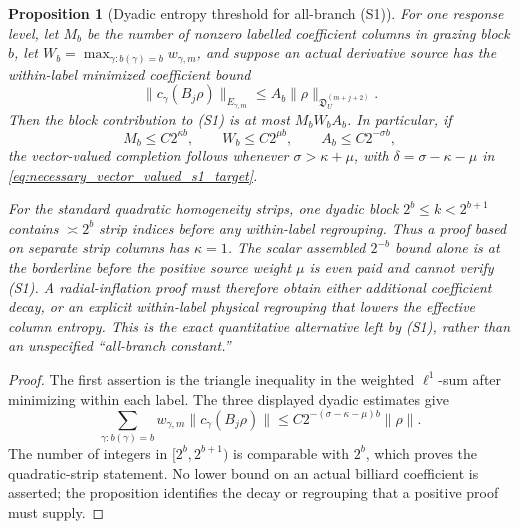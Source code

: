 \documentclass[11pt]{amsart}
\theoremstyle{compactplain}
\newtheorem*{proposition*}{Proposition}
\theoremstyle{compactdefinition}
\theoremstyle{compactremark}
\begin{document}
\begin{proposition*}[Dyadic entropy threshold for all-branch (S1)]
For one response level, let \(M_b\) be the number of nonzero labelled
coefficient columns in grazing block \(b\), let
\(W_b=\max_{\gamma:b(\gamma)=b}w_{\gamma,m}\), and suppose an actual
derivative source has the within-label minimized coefficient bound
\[
 \|c_\gamma(B_j\rho)\|_{E_{\gamma,m}}
 \le A_b\|\rho\|_{\mathfrak D_U^{(m+j+2)}}.
\]
Then the block contribution to (S1) is at most \(M_bW_bA_b\).  In
particular, if
\[
 M_b\le C2^{\kappa b},\qquad
 W_b\le C2^{\mu b},\qquad
 A_b\le C2^{-\sigma b},
\]
the vector-valued completion follows whenever
\(\sigma>\kappa+\mu\), with
\(\delta=\sigma-\kappa-\mu\) in
\eqref{eq:necessary_vector_valued_s1_target}.

For the standard quadratic homogeneity strips, one dyadic block
\(2^b\le k<2^{b+1}\) contains \(\asymp2^b\) strip indices before any
within-label regrouping.  Thus a proof based on separate strip columns has
\(\kappa=1\).  The scalar assembled \(2^{-b}\) bound alone is at the
borderline before the positive source weight \(\mu\) is even paid and cannot
verify (S1).  A radial-inflation proof must therefore obtain either
additional coefficient decay, or an explicit within-label physical
regrouping that lowers the effective column entropy.  This is the exact
quantitative alternative left by (S1), rather than an unspecified
``all-branch constant.''
\end{proposition*}

\begin{proof}
The first assertion is the triangle inequality in the weighted
\(\ell^1\)-sum after minimizing within each label.  The three displayed
dyadic estimates give
\[
 \sum_{\gamma:b(\gamma)=b}w_{\gamma,m}
 \|c_\gamma(B_j\rho)\|
 \le C2^{-(\sigma-\kappa-\mu)b}\|\rho\|.
\]
The number of integers in
\([2^b,2^{b+1})\) is comparable with \(2^b\), which proves the quadratic-strip
statement.  No lower bound on an actual billiard coefficient is asserted;
the proposition identifies the decay or regrouping that a positive proof
must supply.
\end{proof}
\end{document}
